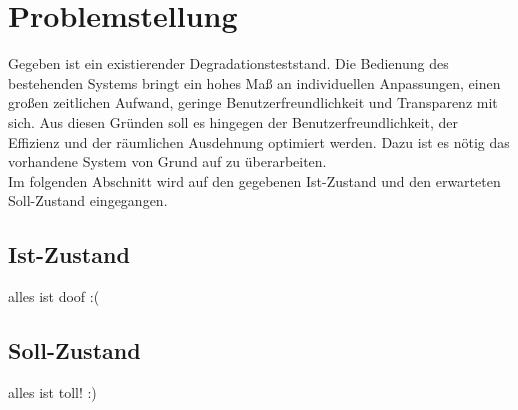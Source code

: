 \chapter{Problemstellung}
\label{chapter_Problemstellung}

Gegeben ist ein existierender Degradationsteststand. Die Bedienung des bestehenden Systems bringt ein hohes Maß an individuellen Anpassungen, einen großen zeitlichen Aufwand, geringe Benutzerfreundlichkeit und Transparenz mit sich. Aus diesen Gründen soll es hingegen der Benutzerfreundlichkeit, der Effizienz und der räumlichen Ausdehnung optimiert werden. Dazu ist es nötig das vorhandene System von Grund auf zu überarbeiten.\\
Im folgenden Abschnitt wird auf den gegebenen Ist-Zustand und den erwarteten Soll-Zustand eingegangen.

\section{Ist-Zustand}
\label{section_Ist-Zustand}
alles ist doof :(

\section{Soll-Zustand}
\label{section_Ist-Zustand}
alles ist toll! :)